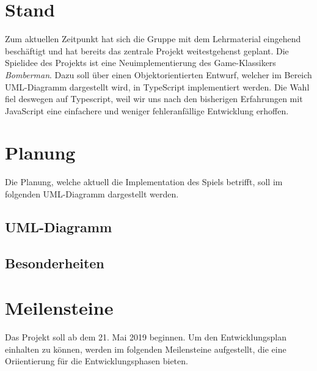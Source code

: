 \documentclass[10pt, a4paper]{report}
\begin{document}
	\section{Stand}
	Zum aktuellen Zeitpunkt hat sich die Gruppe mit dem Lehrmaterial eingehend beschäftigt und hat bereits das zentrale Projekt weitestgehenst geplant. Die Spielidee des Projekts ist eine Neuimplementierung des Game-Klassikers \textit{Bomberman}. Dazu soll über einen Objektorientierten Entwurf, welcher im Bereich UML-Diagramm dargestellt wird, in TypeScript implementiert werden. Die Wahl fiel deswegen auf Typescript, weil wir uns nach den bisherigen Erfahrungen mit JavaScript eine einfachere und weniger fehleranfällige Entwicklung erhoffen.
	\section{Planung}
	Die Planung, welche aktuell die Implementation des Spiels betrifft, soll im folgenden UML-Diagramm dargestellt werden. 
	\subsection{UML-Diagramm}
	\subsection{Besonderheiten}
	\section{Meilensteine}
	Das Projekt soll ab dem 21. Mai 2019 beginnen. Um den Entwicklungsplan einhalten zu können, werden im folgenden Meilensteine aufgestellt, die eine Oriientierung für
	die Entwicklungsphasen bieten. 
	
\end{document}
